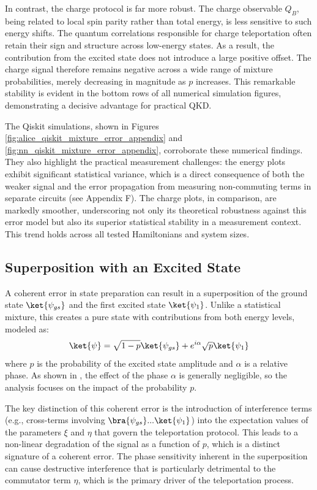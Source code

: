 In contrast, the charge protocol is far more robust. The charge observable $Q_B$, being related to local spin parity rather than total energy, is less sensitive to such energy shifts. The quantum correlations responsible for charge teleportation often retain their sign and structure across low-energy states. As a result, the contribution from the excited state does not introduce a large positive offset. The charge signal therefore remains negative across a wide range of mixture probabilities, merely decreasing in magnitude as $p$ increases. This remarkable stability is evident in the bottom rows of all numerical simulation figures, demonstrating a decisive advantage for practical QKD.

The Qiskit simulations, shown in Figures \ref{fig:alice_qiskit_mixture_error_appendix} and \ref{fig:nn_qiskit_mixture_error_appendix}, corroborate these numerical findings. They also highlight the practical measurement challenges: the energy plots exhibit significant statistical variance, which is a direct consequence of both the weaker signal and the error propagation from measuring non-commuting terms in separate circuits (see Appendix F). The charge plots, in comparison, are markedly smoother, underscoring not only its theoretical robustness against this error model but also its superior statistical stability in a measurement context. This trend holds across all tested Hamiltonians and system sizes.

\subsection{Superposition with an Excited State}



A coherent error in state preparation can result in a superposition of the ground state $\ket{\psi_{gs}}$ and the first excited state $\ket{\psi_{1}}$. Unlike a statistical mixture, this creates a pure state with contributions from both energy levels, modeled as:
\begin{equation*}
\ket{\psi} = \sqrt{1-p}\ket{\psi_{gs}} + e^{i\alpha}\sqrt{p}\ket{\psi_{1}}
\end{equation*}
where $p$ is the probability of the excited state amplitude and $\alpha$ is a relative phase. As shown in \cite{QKDbyQET}, the effect of the phase $\alpha$ is generally negligible, so the analysis focuses on the impact of the probability $p$.

The key distinction of this coherent error is the introduction of interference terms (e.g., cross-terms involving $\bra{\psi_{gs}}...\ket{\psi_{1}}$) into the expectation values of the parameters $\xi$ and $\eta$ that govern the teleportation protocol. This leads to a non-linear degradation of the signal as a function of $p$, which is a distinct signature of a coherent error. The phase sensitivity inherent in the superposition can cause destructive interference that is particularly detrimental to the commutator term $\eta$, which is the primary driver of the teleportation process.

